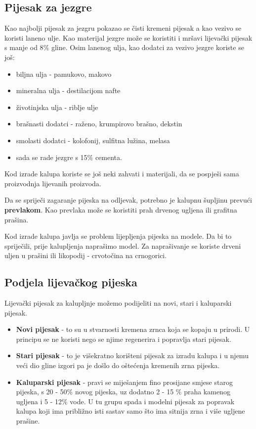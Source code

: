 \documentclass[a4paper,12pt]{article}
\numberwithin{figure}{section}
\begin{document}
\subsection{Pijesak za jezgre}
Kao najbolji pijesak za jezgru pokazao se čisti kremeni pijesak a kao vezivo se koristi laneno ulje. Kao materijal jezgre može se koristiti i mršavi lijevački pijesak s manje od 8$\%$ gline. Osim lanenog ulja, kao dodatci za vezivo jezgre koriste se još:
\begin{itemize}
\item biljna ulja - pamukovo, makovo
\item mineralna ulja - destilacijom nafte
\item životinjska ulja - riblje ulje
\item brašnasti dodatci - raženo, krumpirovo brašno, dekstin
\item smolasti dodatci - kolofonij, sulfitna lužina, melasa
\item sada se rade jezgre s 15$\%$ cementa.
\end{itemize}
Kod izrade kalupa koriste se još neki zahvati i materijali, da se pospješi sama proizvodnja lijevanih proizvoda.\par
Da se spriječi zagaranje pijeska na odljevak, potrebno je kalupnu šupljinu prevući \textbf{prevlakom}. Kao prevlaka može se koristiti prah drvenog ugljena ili grafitna prašina.\par
Kod izrade kalupa javlja se problem lijepljenja pijeska na modele. Da bi to spriječili, prije kalupljenja naprašimo model. Za naprašivanje se koriste drveni uljen u prašini ili likopodij - crvotočina na crnogorici.
\subsection{Podjela lijevačkog pijeska}
Lijevački pijesak za kalupljnje možemo podijeliti na novi, stari i kaluparski pijesak.
\begin{itemize}
\item \textbf{Novi pijesak} - to su u stvarnosti kremena zrnca koja se kopaju u prirodi. U principu se ne koristi nego se njime regenerira i popravlja stari pijesak.
\item \textbf{Stari pijesak} - to je višekratno korišteni pijesak za izradu kalupa i u njemu veći dio gline izgori pa je došlo do oštećenja kremenih zrna pijeska.
\item \textbf{Kaluparski pijesak} - pravi se miješanjem fino prosijane smjese starog pijeska, s 20 - 50$\%$ novog pijeska, uz dodatno 2 - 15 $\%$ praha kamenog ugljena i 5 - 12$\%$  vode. U tu grupu spada i modelni pijesak za popravak kalupa koji ima približno isti sastav samo što ima sitnija zrna i više ugljene prašine.
\end{itemize}
\end{document}
